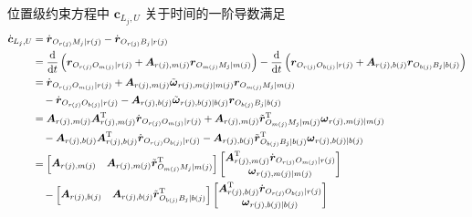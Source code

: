 位置级约束方程中 $\boldsymbol{c}_{L_j,U}$ 关于时间的一阶导数满足
\begin{align}
  \dot{\boldsymbol{c}}_{L_j,U} &= \dot{\boldsymbol{r}}_{O_{r(j)} M_j \mid r(j)} - \dot{\boldsymbol{r}}_{O_{r(j)} B_j \mid r(j)} \label{eq:10.55} \\
  &= \frac{\mathrm{d}}{\mathrm{d}t}\left( \boldsymbol{r}_{O_{r(j)} O_{m(j)} \mid r(j)} + \boldsymbol{A}_{r(j),m(j)} \boldsymbol{r}_{O_{m(j)} M_j \mid m(j)} \right) - \frac{\mathrm{d}}{\mathrm{d}t}\left( \boldsymbol{r}_{O_{r(j)} O_{b(j)} \mid r(j)} + \boldsymbol{A}_{r(j),b(j)} \boldsymbol{r}_{O_{b(j)} B_j \mid b(j)} \right) \notag \\
  &= \dot{\boldsymbol{r}}_{O_{r(j)} O_{m(j)} \mid r(j)} + \boldsymbol{A}_{r(j),m(j)} \tilde{\boldsymbol{\omega}}_{r(j),m(j) \mid m(j)} \boldsymbol{r}_{O_{m(j)} M_j \mid m(j)} \notag \\
  &\quad - \dot{\boldsymbol{r}}_{O_{r(j)} O_{b(j)} \mid r(j)} - \boldsymbol{A}_{r(j),b(j)} \tilde{\boldsymbol{\omega}}_{r(j),b(j) \mid b(j)} \boldsymbol{r}_{O_{b(j)} B_j \mid b(j)} \notag \\
  &= \boldsymbol{A}_{r(j),m(j)} \boldsymbol{A}_{r(j),m(j)}^{\mathrm{T}} \dot{\boldsymbol{r}}_{O_{r(j)} O_{m(j)} \mid r(j)} + \boldsymbol{A}_{r(j),m(j)} \tilde{\boldsymbol{r}}_{O_{m(j)} M_j \mid m(j)}^{\mathrm{T}} \boldsymbol{\omega}_{r(j),m(j) \mid m(j)} \notag \\
  &\quad - \boldsymbol{A}_{r(j),b(j)} \boldsymbol{A}_{r(j),b(j)}^{\mathrm{T}} \dot{\boldsymbol{r}}_{O_{r(j)} O_{b(j)} \mid r(j)} - \boldsymbol{A}_{r(j),b(j)} \tilde{\boldsymbol{r}}_{O_{b(j)} B_j \mid b(j)}^{\mathrm{T}} \boldsymbol{\omega}_{r(j),b(j) \mid b(j)} \notag \\
  &= \begin{bmatrix} \boldsymbol{A}_{r(j),m(j)} & \boldsymbol{A}_{r(j),m(j)} \tilde{\boldsymbol{r}}_{O_{m(j)} M_j \mid m(j)}^{\mathrm{T}} \end{bmatrix}
  \begin{bmatrix} \boldsymbol{A}_{r(j),m(j)}^{\mathrm{T}} \dot{\boldsymbol{r}}_{O_{r(j)} O_{m(j)} \mid r(j)} \\ \boldsymbol{\omega}_{r(j),m(j) \mid m(j)} \end{bmatrix} \notag \\
  &\quad - \begin{bmatrix} \boldsymbol{A}_{r(j),b(j)} & \boldsymbol{A}_{r(j),b(j)} \tilde{\boldsymbol{r}}_{O_{b(j)} B_j \mid b(j)}^{\mathrm{T}} \end{bmatrix}
  \begin{bmatrix} \boldsymbol{A}_{r(j),b(j)}^{\mathrm{T}} \dot{\boldsymbol{r}}_{O_{r(j)} O_{b(j)} \mid r(j)} \\ \boldsymbol{\omega}_{r(j),b(j) \mid b(j)} \end{bmatrix} \notag \\

\end{align}
